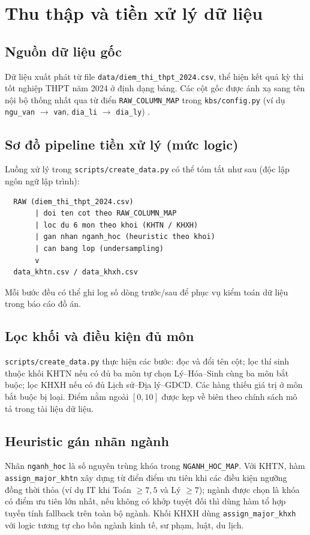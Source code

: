 \chapter{Thu thập và tiền xử lý dữ liệu}

\section{Nguồn dữ liệu gốc}
Dữ liệu xuất phát từ file \texttt{data/diem\_thi\_thpt\_2024.csv}, thể hiện kết quả kỳ thi tốt nghiệp THPT năm 2024 ở định dạng bảng. Các cột gốc được ánh xạ sang tên nội bộ thống nhất qua từ điển \texttt{RAW\_COLUMN\_MAP} trong \texttt{kbs/config.py} (ví dụ \texttt{ngu\_van} $\rightarrow$ \texttt{van}, \texttt{dia\_li} $\rightarrow$ \texttt{dia\_ly}) \cite{docs_dataset}.

\section{Sơ đồ pipeline tiền xử lý (mức logic)}
Luồng xử lý trong \texttt{scripts/create\_data.py} có thể tóm tắt như sau (độc lập ngôn ngữ lập trình):
\begin{verbatim}
  RAW (diem_thi_thpt_2024.csv)
       | doi ten cot theo RAW_COLUMN_MAP
       | loc du 6 mon theo khoi (KHTN / KHXH)
       | gan nhan nganh_hoc (heuristic theo khoi)
       | can bang lop (undersampling)
       v
  data_khtn.csv / data_khxh.csv
\end{verbatim}
Mỗi bước đều có thể ghi log số dòng trước/sau để phục vụ kiểm toán dữ liệu trong báo cáo đồ án.

\section{Lọc khối và điều kiện đủ môn}
\texttt{scripts/create\_data.py} thực hiện các bước: đọc và đổi tên cột; lọc thí sinh thuộc khối KHTN nếu có đủ ba môn tự chọn Lý--Hóa--Sinh cùng ba môn bắt buộc; lọc KHXH nếu có đủ Lịch sử--Địa lý--GDCD. Các hàng thiếu giá trị ở môn bắt buộc bị loại. Điểm nằm ngoài $[0,10]$ được kẹp về biên theo chính sách mô tả trong tài liệu dữ liệu.

\section{Heuristic gán nhãn ngành}
Nhãn \texttt{nganh\_hoc} là số nguyên trùng khóa trong \texttt{NGANH\_HOC\_MAP}. Với KHTN, hàm \texttt{assign\_major\_khtn} xây dựng từ điển điểm ưu tiên khi các điều kiện ngưỡng đồng thời thỏa (ví dụ IT khi Toán $\geq 7{,}5$ và Lý $\geq 7$); ngành được chọn là khóa có điểm ưu tiên lớn nhất, nếu không có khớp tuyệt đối thì dùng hàm tổ hợp tuyến tính fallback trên toàn bộ ngành. Khối KHXH dùng \texttt{assign\_major\_khxh} với logic tương tự cho bốn ngành kinh tế, sư phạm, luật, du lịch.

